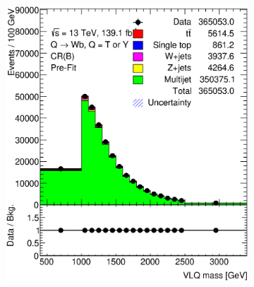 \begin{figure}[hbt!]
\begin{subfigure}{.35\textwidth}
		\caption{}
		\label{fig:app:cr_b:jet_pt}
	\end{subfigure}
	\begin{subfigure}{.35\textwidth}
		\centering
		\includegraphics[width=\linewidth,height=\textheight,keepaspectratio]{CR_B_VLQM.eps}
		\caption{}
		\label{fig:app:cr_b:VLQM}
	\end{subfigure}\hspace{0.6cm}
	\begin{subfigure}{.35\textwidth}
		\centering

\end{subfigure}
\end{figure}
